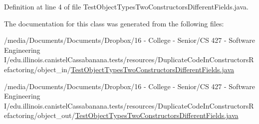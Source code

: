 Definition at line 4 of file TestObjectTypesTwoConstructorsDifferentFields.java.



The documentation for this class was generated from the following files:\begin{DoxyCompactItemize}
\item 
/media/Documents/Documents/Dropbox/16 -\/ College -\/ Senior/CS 427 -\/ Software Engineering I/edu.illinois.canistelCassabanana.tests/resources/DuplicateCodeInConstructorsRefactoring/object\_\-in/\hyperlink{object__in_2TestObjectTypesTwoConstructorsDifferentFields_8java}{TestObjectTypesTwoConstructorsDifferentFields.java}\item 
/media/Documents/Documents/Dropbox/16 -\/ College -\/ Senior/CS 427 -\/ Software Engineering I/edu.illinois.canistelCassabanana.tests/resources/DuplicateCodeInConstructorsRefactoring/object\_\-out/\hyperlink{object__out_2TestObjectTypesTwoConstructorsDifferentFields_8java}{TestObjectTypesTwoConstructorsDifferentFields.java}\end{DoxyCompactItemize}
